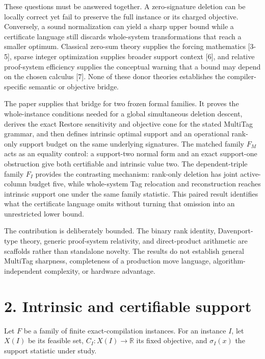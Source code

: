 \documentclass[11pt]{article}
\begin{document}
These questions must be answered together. A zero-signature deletion can be locally correct yet fail to preserve the full instance or its charged objective. Conversely, a sound normalization can yield a sharp upper bound while a certificate language still discards whole-system transformations that reach a smaller optimum. Classical zero-sum theory supplies the forcing mathematics {[}3-5{]}, sparse integer optimization supplies broader support context {[}6{]}, and relative proof-system efficiency supplies the conceptual warning that a bound may depend on the chosen calculus {[}7{]}. None of these donor theories establishes the compiler-specific semantic or objective bridge.

The paper supplies that bridge for two frozen formal families. It proves the whole-instance conditions needed for a global simultaneous deletion descent, derives the exact Restore sensitivity and objective cone for the stated MultiTag grammar, and then defines intrinsic optimal support and an operational rank-only support budget on the same underlying signatures. The matched family \(F_M\) acts as an equality control: a support-two normal form and an exact support-one obstruction give both certifiable and intrinsic value two. The dependent-triple family \(F_I\) provides the contrasting mechanism: rank-only deletion has joint active-column budget five, while whole-system Tag relocation and reconstruction reaches intrinsic support one under the same family statistic. This paired result identifies what the certificate language omits without turning that omission into an unrestricted lower bound.

The contribution is deliberately bounded. The binary rank identity, Davenport-type theory, generic proof-system relativity, and direct-product arithmetic are scaffolds rather than standalone novelty. The results do not establish general MultiTag sharpness, completeness of a production move language, algorithm-independent complexity, or hardware advantage.

\section*{2. Intrinsic and certifiable support}\label{intrinsic-and-certifiable-support}

Let \(F\) be a family of finite exact-compilation instances. For an instance \(I\), let \(X(I)\) be its feasible set, \(C_I:X(I)\to\mathbb{R}\) its fixed objective, and \(\sigma_I(x)\) the support statistic under study.
\end{document}
